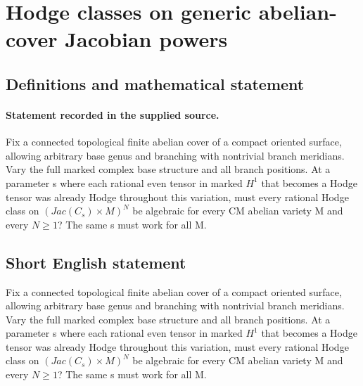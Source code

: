 \documentclass[11pt]{article}
\begin{document}
\section*{Hodge classes on generic abelian-cover Jacobian powers}\label{statement}
\subsection{Definitions and mathematical statement}
\paragraph{Statement recorded in the supplied source.}
Fix a connected topological finite abelian cover of a compact oriented surface, allowing arbitrary base genus and branching with nontrivial branch meridians. Vary the full marked complex base structure and all branch positions. At a parameter s where each rational even tensor in marked $H^{1}$ that becomes a Hodge tensor was already Hodge throughout this variation, must every rational Hodge class on $(Jac(C_s)×M)^N$ be algebraic for every CM abelian variety M and every $N\geq 1$? The same s must work for all M.
\subsection{Short English statement}
Fix a connected topological finite abelian cover of a compact oriented surface, allowing arbitrary base genus and branching with nontrivial branch meridians. Vary the full marked complex base structure and all branch positions. At a parameter s where each rational even tensor in marked $H^{1}$ that becomes a Hodge tensor was already Hodge throughout this variation, must every rational Hodge class on $(Jac(C_s)×M)^N$ be algebraic for every CM abelian variety M and every $N\geq 1$? The same s must work for all M.
\end{document}

